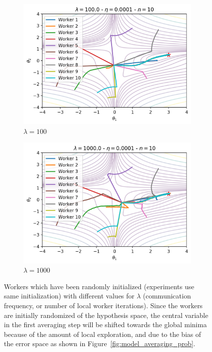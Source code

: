 \begin{figure}[H]
\begin{subfigure}{.24\textwidth}
    \includegraphics[width=\linewidth]{resources/images/model_averaging_cf_100}
    \caption{$\lambda = 100$}
  \end{subfigure}
  \begin{subfigure}{.24\textwidth}
    \centering
    \includegraphics[width=\linewidth]{resources/images/model_averaging_cf_1000}
    \caption{$\lambda = 1000$}
  \end{subfigure}
  \label{fig:model_averaging_cf}
  \caption{Workers which have been randomly initialized (experiments use same initialization) with different values for $\lambda$ (communication frequency, or number of local worker iterations). Since the workers are initially randomized of the hypothesis space, the central variable in the first averaging step will be shifted towards the global minima because of the amount of local exploration, and due to the bias of the error space as shown in Figure~\ref{fig:model_averaging_prob}.}
\end{figure}

